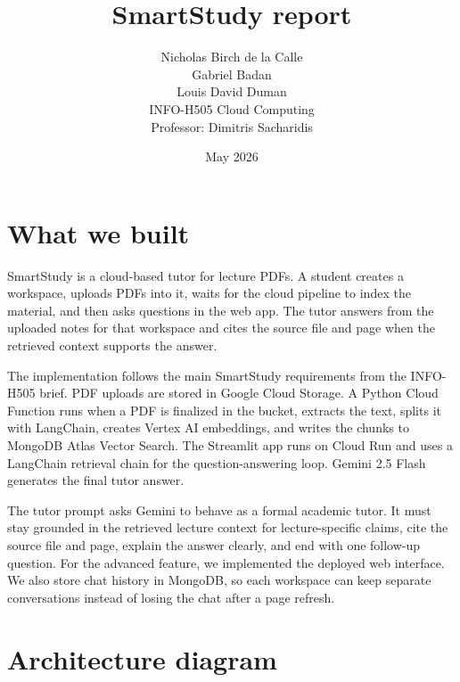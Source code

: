 \documentclass[11pt,a4paper]{article}
\title{SmartStudy report}
\author{
Nicholas Birch de la Calle\\
Gabriel Badan\\
Louis David Duman\\[0.6em]
\small INFO-H505 Cloud Computing\\
\small Professor: Dimitris Sacharidis
}
\date{May 2026}
\begin{document}
\maketitle

\section*{What we built}

SmartStudy is a cloud-based tutor for lecture PDFs. A student creates a workspace, uploads PDFs into it, waits for the cloud pipeline to index the material, and then asks questions in the web app. The tutor answers from the uploaded notes for that workspace and cites the source file and page when the retrieved context supports the answer.

The implementation follows the main SmartStudy requirements from the INFO-H505 brief. PDF uploads are stored in Google Cloud Storage. A Python Cloud Function runs when a PDF is finalized in the bucket, extracts the text, splits it with LangChain, creates Vertex AI embeddings, and writes the chunks to MongoDB Atlas Vector Search. The Streamlit app runs on Cloud Run and uses a LangChain retrieval chain for the question-answering loop. Gemini 2.5 Flash generates the final tutor answer.

The tutor prompt asks Gemini to behave as a formal academic tutor. It must stay grounded in the retrieved lecture context for lecture-specific claims, cite the source file and page, explain the answer clearly, and end with one follow-up question. For the advanced feature, we implemented the deployed web interface. We also store chat history in MongoDB, so each workspace can keep separate conversations instead of losing the chat after a page refresh.

\section*{Architecture diagram}
\end{document}

